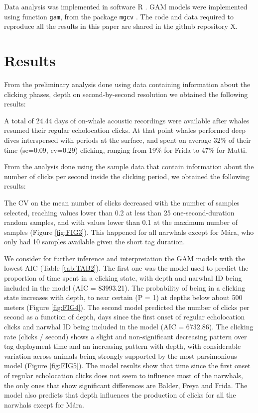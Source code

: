 \documentclass[preprint]{JASA}
\begin{document}
Data analysis was implemented in software R \citep{r2021}.  GAM models were implemented using function \verb"gam", from the package \verb"mgcv" \citep{wood2011}. The code and data required to reproduce all the results in this paper are shared in the github repository X.

\section{\label{sec:3} Results}

From the preliminary analysis done using data containing information about the clicking phases, depth on second-by-second resolution we obtained the following results:

A total of 24.44 days of on-whale acoustic recordings were available after whales resumed their regular echolocation clicks. At that point whales performed deep dives interspersed with periods at the surface, and spent on average 32\% of their time  (se=0.09, cv=0.29) clicking, ranging from 19\% for Frida to 47\% for Mutti.


From the analysis done using the sample data that contain information about the number of clicks per second inside the clicking period, we obtained the following results:

The CV on the mean number of clicks decreased with the number of samples selected, reaching values lower than 0.2  at less than 25 one-second-duration random samples, and with values lower than 0.1 at the maximum number of samples (Figure \ref{fig:FIG3}). This happened for all narwhals except for Mára, who only had 10 samples available given the short tag duration.

We consider for further inference and interpretation the GAM models with the lowest AIC (Table \ref{tab:TAB2}). The first one was the model used to predict the proportion of time spent in a clicking state, with depth and narwhal ID being included in the model (AIC =  83993.21). The probability of being in a clicking state increases with depth, to near certain (P = 1) at depths below about 500 meters (Figure \ref{fig:FIG4}). The second model predicted the number of clicks per second as a function of depth, days since the first onset of regular echolocation clicks and narwhal ID being included in the model (AIC = 6732.86). The clicking rate (clicks / second) shows a slight and non-significant decreasing pattern over tag deployment time and an increasing pattern with depth, with considerable variation across animals being strongly supported by the most parsimonious model (Figure \ref{fig:FIG5}). The model results show that time since the first onset of regular echolocation clicks does not seem to influence most of the narwhals, the only ones that show significant differences are Balder, Freya and Frida.  The model also predicts that depth influences the production of clicks for all the narwhals except for Mára. 
\end{document}
